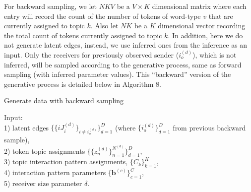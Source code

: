 \documentclass[a4paper]{article}
\begin{document}
For backward sampling, we let $NKV$ be a $V\times K$ dimensional matrix where each entry will record the count of the number of tokens of word-type $v$ that are currently assigned to topic $k$. Also let $NK$ be a $K$ dimensional vector recording the total count of tokens currently assigned to topic $k$. In addition, here we do not generate latent edges, instead, we use inferred ones from the inference as an input. Only the receivers for previously observed sender ($i_o^{(d)}$), which is not inferred, will be sampled according to the generative process, same as forward sampling (with inferred parameter values). This “backward” version of the generative process is detailed below in Algorithm 8.
   \begin{algorithm}[H]
   	\SetAlgoLined
   	\caption{Generate data with backward sampling}
   	Input:\\ 1) latent edges $\{\{iJ^{(d)}_i\}_{i \neq i_o^{(d)}}\}_{d=1}^D$ (where $\{i_o^{(d)}\}_{d=1}^D$ from previous backward sample),\\
   	 2) token topic assignments $\{\{z_n^{(d)}\}_{n=1}^{N^{(d)}}\}_{d=1}^D$,\\
   	 3) topic interaction pattern assignments, $\{C_k\}_{k=1}^K$,\\
   	   4) interaction pattern parameters $\{\boldsymbol{b}^{(c)}\}_{c=1}^C$, \\
   	   5) receiver size parameter $\delta$.\\\\
   \end{algorithm}
\end{document}
